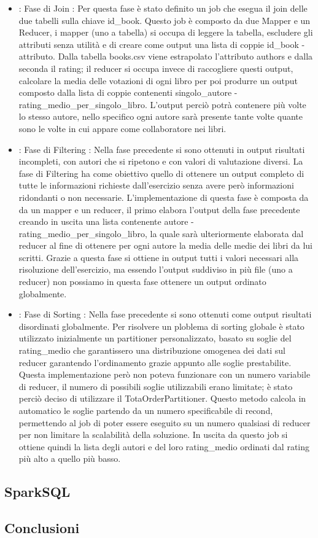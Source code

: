 \begin{itemize}
    \item \textbf{}: Fase di Join : Per questa fase è stato definito un job che esegua il join delle due tabelli sulla chiave
    id_book. Questo job è composto da due Mapper e un Reducer, i mapper (uno a tabella) si occupa di leggere la tabella, escludere
    gli attributi senza utilità e di creare come output una lista di coppie id_book - attributo.
    Dalla tabella books.csv viene estrapolato l'attributo authors e dalla seconda il rating; il reducer si occupa invece
    di raccogliere questi output, calcolare la media delle votazioni di ogni libro per poi produrre un output composto dalla
    lista di coppie contenenti singolo_autore - rating_medio_per_singolo_libro. L'output perciò potrà contenere più volte lo stesso
    autore, nello specifico ogni autore sarà presente tante volte quante sono le volte in cui appare come collaboratore nei libri.

    \item \textbf{}: Fase di Filtering : Nella fase precedente si sono ottenuti in output risultati incompleti, con autori che si
    ripetono e con valori di valutazione diversi. La fase di Filtering ha come obiettivo quello di ottenere un output
    completo di tutte le informazioni richieste dall'esercizio senza avere però informazioni ridondanti o non necessarie.
    L'implementazione di questa fase è composta da da un mapper e un reducer, il primo elabora l'output della fase precedente creando
    in uscita una lista contenente autore - rating_medio_per_singolo_libro, la quale sarà ulteriormente elaborata dal reducer al fine di ottenere
    per ogni autore la media delle medie dei libri da lui scritti.
    Grazie a questa fase si ottiene in output tutti i valori necessari alla risoluzione dell'esercizio, ma essendo l'output suddiviso in più file
    (uno a reducer) non possiamo in questa fase ottenere un output ordinato globalmente.

    \item \textbf{}: Fase di Sorting : Nella fase precedente si sono ottenuti come output risultati disordinati globalmente.
    Per risolvere un ploblema di sorting globale è stato utilizzato inizialmente un partitioner personalizzato, basato su soglie del rating_medio
    che garantissero una distribuzione omogenea dei dati sul reducer garantendo l'ordinamento grazie appunto alle soglie prestabilite.
    Questa implementazione però non poteva funzionare con un numero variabile di reducer, il numero di possibili soglie utilizzabili erano limitate;
    è stato perciò deciso di utilizzare il TotaOrderPartitioner.
    Questo metodo calcola in automatico le soglie partendo da un numero specificabile di recond, permettendo al job di poter essere eseguito su un numero qualsiasi
    di reducer per non limitare la scalabilità della soluzione.
    In uscita da questo job si ottiene quindi la lista degli autori e del loro rating_medio ordinati dal rating più alto a quello più basso.
    



    \end{itemize}

\subsection{SparkSQL}

\subsection{Conclusioni}
